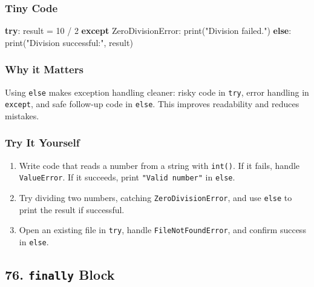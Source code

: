 \documentclass[
  letterpaper,
  DIV=11,
  numbers=noendperiod]{scrreprt}
\newenvironment{Shaded}{\begin{snugshade}}{\end{snugshade}}
\newcommand{\BuiltInTok}[1]{\textcolor[rgb]{0.00,0.23,0.31}{#1}}
\newcommand{\ControlFlowTok}[1]{\textcolor[rgb]{0.00,0.23,0.31}{\textbf{#1}}}
\newcommand{\DecValTok}[1]{\textcolor[rgb]{0.68,0.00,0.00}{#1}}
\newcommand{\NormalTok}[1]{\textcolor[rgb]{0.00,0.23,0.31}{#1}}
\newcommand{\OperatorTok}[1]{\textcolor[rgb]{0.37,0.37,0.37}{#1}}
\newcommand{\PreprocessorTok}[1]{\textcolor[rgb]{0.68,0.00,0.00}{#1}}
\newcommand{\StringTok}[1]{\textcolor[rgb]{0.13,0.47,0.30}{#1}}
\providecommand{\tightlist}{%
  \setlength{\itemsep}{0pt}\setlength{\parskip}{0pt}}
\begin{document}
\subsubsection{Tiny Code}\label{tiny-code-74}

\begin{Shaded}
\begin{Highlighting}[]
\ControlFlowTok{try}\NormalTok{:}
\NormalTok{    result }\OperatorTok{=} \DecValTok{10} \OperatorTok{/} \DecValTok{2}
\ControlFlowTok{except} \PreprocessorTok{ZeroDivisionError}\NormalTok{:}
    \BuiltInTok{print}\NormalTok{(}\StringTok{"Division failed."}\NormalTok{)}
\ControlFlowTok{else}\NormalTok{:}
    \BuiltInTok{print}\NormalTok{(}\StringTok{"Division successful:"}\NormalTok{, result)}
\end{Highlighting}
\end{Shaded}

\subsubsection{Why it Matters}\label{why-it-matters-74}

Using \texttt{else} makes exception handling cleaner: risky code in
\texttt{try}, error handling in \texttt{except}, and safe follow-up code
in \texttt{else}. This improves readability and reduces mistakes.

\subsubsection{Try It Yourself}\label{try-it-yourself-74}

\begin{enumerate}
\def\labelenumi{\arabic{enumi}.}
\tightlist
\item
  Write code that reads a number from a string with \texttt{int()}. If
  it fails, handle \texttt{ValueError}. If it succeeds, print
  \texttt{"Valid\ number"} in \texttt{else}.
\item
  Try dividing two numbers, catching \texttt{ZeroDivisionError}, and use
  \texttt{else} to print the result if successful.
\item
  Open an existing file in \texttt{try}, handle
  \texttt{FileNotFoundError}, and confirm success in \texttt{else}.
\end{enumerate}

\subsection{\texorpdfstring{76. \texttt{finally}
Block}{76. finally Block}}\label{finally-block}
\end{document}

